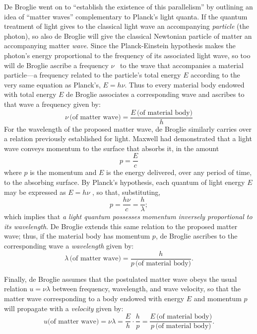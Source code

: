De Broglie went on to ``establish the existence of this parallelism'' by
outlining an idea of ``matter waves'' complementary to Planck's light
quanta. If the quantum treatment of light gives to the classical light
wave an accompanying \emph{particle} (the photon), so also de Broglie
will give the classical Newtonian particle of matter an accompanying
matter \emph{wave}. Since the Planck-Einstein hypothesis makes the
photon's energy proportional to the frequency of its associated light
wave, so too will de Broglie ascribe a frequency $\nu$~ to the wave
that accompanies a material particle---a frequency related to the
particle's total energy $E$ according to the very same equation as
Planck's, $E = h\nu$. Thus to every material body endowed with
total energy $E$ de Broglie associates a corresponding wave and
ascribes to that wave a frequency given by:
\begin{equation*}
\nu\,\text{(of matter wave)} = \frac{E\,\text{(of material body)}}{h}
\end{equation*}
For the wavelength of the proposed matter wave, de Broglie similarly
carries over a relation previously established for light. Maxwell had
demonstrated that a light wave conveys momentum to the surface that
absorbs it, in the amount
\begin{equation*}
p = \frac{E}{c}
\end{equation*}
where $p$ is the momentum and $E$ is the energy delivered,
over any period of time, to the absorbing surface. By Planck's
hypothesis, each quantum of light energy $E$ may be expressed as
$E = h\nu$ , so that, substituting,
\begin{equation*}
p = \frac{h\nu}{c} = \frac{h}{\lambda};
\end{equation*}
which implies that \emph{a light quantum possesses} \emph{momentum
inversely proportional to its wavelength}. De Broglie extends this same
relation to the proposed matter wave; thus, if the material body has
momentum $p$, de Broglie ascribes to the corresponding wave a
\emph{wavelength} given by:
\begin{equation*}
\lambda\,\text{(of matter wave)} = \frac{h}{p\,\text{(of material body)}}.
\end{equation*}

Finally, de Broglie assumes that the postulated matter wave obeys the
usual relation $u = \nu\lambda$ between frequency, wavelength, and
wave velocity, so that the matter wave corresponding to a body endowed
with energy $E$ and momentum $p$ will propagate with a
\emph{velocity} given by:
\begin{equation*}
u\text{(of matter wave)}=\nu\lambda=\frac{E}{h}\cdot\frac{h}{p}=
\frac{E\,\text{(of material body)}}{p\,\text{(of material body)}}.
\end{equation*}

